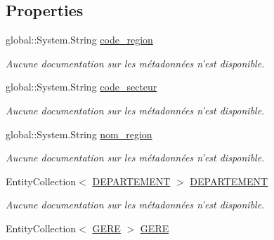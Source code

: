 \subsection*{Properties}
\begin{DoxyCompactItemize}
\item 
global\-::\-System.\-String \hyperlink{class_model_1_1_r_e_g_i_o_n_a7c0fd7797a562f170daff2673177dc83}{code\-\_\-region}
\begin{DoxyCompactList}\small\item\em Aucune documentation sur les métadonnées n'est disponible. \end{DoxyCompactList}\item 
global\-::\-System.\-String \hyperlink{class_model_1_1_r_e_g_i_o_n_a8a17b4d46de541201536619d69596c90}{code\-\_\-secteur}
\begin{DoxyCompactList}\small\item\em Aucune documentation sur les métadonnées n'est disponible. \end{DoxyCompactList}\item 
global\-::\-System.\-String \hyperlink{class_model_1_1_r_e_g_i_o_n_a4dceb2c8c2a0b59bd07caba731ff984a}{nom\-\_\-region}
\begin{DoxyCompactList}\small\item\em Aucune documentation sur les métadonnées n'est disponible. \end{DoxyCompactList}\item 
Entity\-Collection$<$ \hyperlink{class_model_1_1_d_e_p_a_r_t_e_m_e_n_t}{D\-E\-P\-A\-R\-T\-E\-M\-E\-N\-T} $>$ \hyperlink{class_model_1_1_r_e_g_i_o_n_a4c03f8b282035bb407ba160cd96ea51f}{D\-E\-P\-A\-R\-T\-E\-M\-E\-N\-T}
\begin{DoxyCompactList}\small\item\em Aucune documentation sur les métadonnées n'est disponible. \end{DoxyCompactList}\item 
Entity\-Collection$<$ \hyperlink{class_model_1_1_g_e_r_e}{G\-E\-R\-E} $>$ \hyperlink{class_model_1_1_r_e_g_i_o_n_a331f4581a87b7e6d2b23377530395efa}{G\-E\-R\-E}

\end{DoxyCompactItemize}

